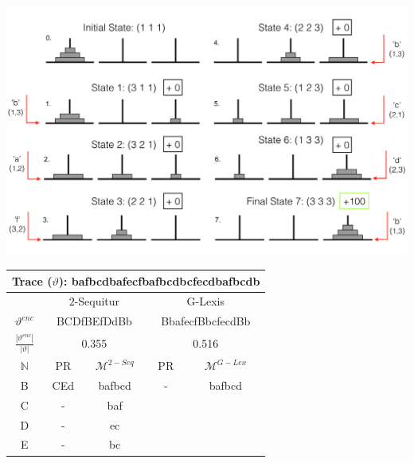 \documentclass[colorinlistoftodos]{article}
\theoremstyle{definition}
\begin{document}
 \begin{minipage}{\textwidth}
  \begin{minipage}[b]{0.49\textwidth}
    \centering
    \includegraphics[width=\textwidth]{figures/hanoi_problem.png}
    \label{fig:hanoi}
  \end{minipage}
  \hfill
  \begin{minipage}[b]{0.49\textwidth}
    \centering
    \begin{tabular}{c | c c | c c } %
\hline\hline %
 \multicolumn{5}{c}{Trace ($\vartheta$): bafbcdbafecfbafbcdbcfecdbafbcdb
} \\
\hline\hline
  & \multicolumn{2}{c}{$2$-Sequitur} & \multicolumn{2}{c}{G-Lexis}\\
\hline
 $\vartheta^{enc}$ & \multicolumn{2}{c}{BCDfBEfDdBb} & \multicolumn{2}{c}{BbafecfBbcfecdBb}\\
 $\frac{|\vartheta^{enc}|}{|\vartheta|}$ & \multicolumn{2}{c}{0.355} & \multicolumn{2}{c}{0.516}\\
\hline \hline
$\mathbb{N}$ & PR & $\mathcal{M}^{2-Seq}$ & PR & $\mathcal{M}^{G-Lex}$\\ %
\hline %
B & CEd & bafbcd & - & bafbcd\\
C & - & baf &&  \\
D & - & ec &&  \\
E & - & bc &&  \\ 
\hline %
\end{tabular}
      \label{table:optimal_grammar}
    \end{minipage}
  \end{minipage}
  
\end{document}
